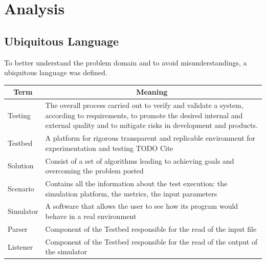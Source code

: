 \documentclass[12pt,a4paper,openright,twoside]{book}
\begin{document}
\chapter{Analysis}

\section{Ubiquitous Language}

To better understand the problem domain and to avoid misunderstandings, a ubiquitous language was defined.

\begin{table}[]
    \begin{tabular}{|l|l|}
    \hline
    \multicolumn{1}{|c|}{\textbf{Term}} & \multicolumn{1}{c|}{\textbf{Meaning}}                                                                                                                                                               \\ \hline
    Testing                             & The overall process carried out to verify and validate a system, according to requirements, to promote the desired internal and external quality and to mitigate risks in development and products. \\ \hline
    Testbed                             & A platform for rigorous transparent and replicable environment for experimentation and testing TODO Cite                                                                                            \\ \hline
    Solution                            & Consist of a set of algorithms leading to achieving goals and overcoming the problem posted                                                                                                         \\ \hline
    Scenario                            & Contains all the information about the test execution: the simulation platform, the metrics, the input parameters                                                                                             \\ \hline
    Simulator                           & A software that allows the user to see how its program would behave in a real environment                                                                                                                     \\ \hline
    Parser                              & Component of the Testbed responsible for the read of the input file                                                                                                                                           \\ \hline
    Listener                            & Component of the Testbed responsible for the read of the output of the simulator                                                                                                                              \\ \hline
    \end{tabular}
    \end{table}
\end{document}

